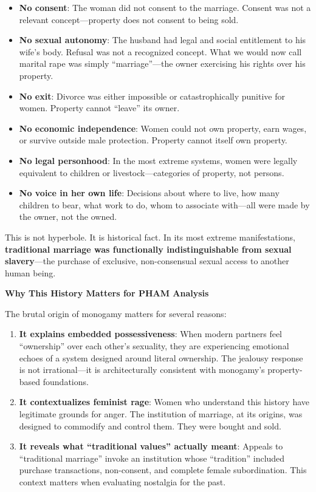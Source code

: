 \documentclass[12pt, letterpaper]{article}
\begin{document}
\begin{itemize}
    \item \textbf{No consent}: The woman did not consent to the marriage. Consent was not a relevant concept---property does not consent to being sold.
    \item \textbf{No sexual autonomy}: The husband had legal and social entitlement to his wife's body. Refusal was not a recognized concept. What we would now call marital rape was simply ``marriage''---the owner exercising his rights over his property.
    \item \textbf{No exit}: Divorce was either impossible or catastrophically punitive for women. Property cannot ``leave'' its owner.
    \item \textbf{No economic independence}: Women could not own property, earn wages, or survive outside male protection. Property cannot itself own property.
    \item \textbf{No legal personhood}: In the most extreme systems, women were legally equivalent to children or livestock---categories of property, not persons.
    \item \textbf{No voice in her own life}: Decisions about where to live, how many children to bear, what work to do, whom to associate with---all were made by the owner, not the owned.
\end{itemize}

This is not hyperbole. It is historical fact. In its most extreme manifestations, \textbf{traditional marriage was functionally indistinguishable from sexual slavery}---the purchase of exclusive, non-consensual sexual access to another human being.

\textbf{Why This History Matters for PHAM Analysis}

The brutal origin of monogamy matters for several reasons:

\begin{enumerate}
    \item \textbf{It explains embedded possessiveness}: When modern partners feel ``ownership'' over each other's sexuality, they are experiencing emotional echoes of a system designed around literal ownership. The jealousy response is not irrational---it is architecturally consistent with monogamy's property-based foundations.
    
    \item \textbf{It contextualizes feminist rage}: Women who understand this history have legitimate grounds for anger. The institution of marriage, at its origins, was designed to commodify and control them. They were bought and sold.
    
    \item \textbf{It reveals what ``traditional values'' actually meant}: Appeals to ``traditional marriage'' invoke an institution whose ``tradition'' included purchase transactions, non-consent, and complete female subordination. This context matters when evaluating nostalgia for the past.
\end{enumerate}
\end{document}
